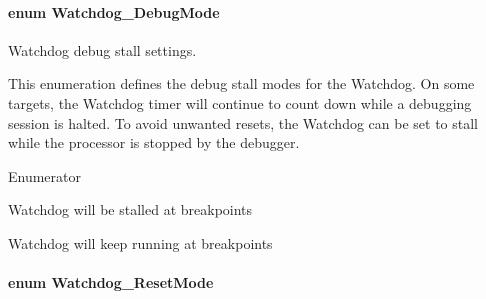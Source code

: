 \paragraph[{Watchdog\+\_\+\+Debug\+Mode}]{\setlength{\rightskip}{0pt plus 5cm}enum {\bf Watchdog\+\_\+\+Debug\+Mode}}\label{_watchdog_8h_ab1aa5862661c88a16b9d7bc12709d51e}


Watchdog debug stall settings. 

This enumeration defines the debug stall modes for the Watchdog. On some targets, the Watchdog timer will continue to count down while a debugging session is halted. To avoid unwanted resets, the Watchdog can be set to stall while the processor is stopped by the debugger. \begin{Desc}
\item[Enumerator]\par
\begin{description}
\item[{\em 
Watchdog\+\_\+\+D\+E\+B\+U\+G\+\_\+\+S\+T\+A\+L\+L\+\_\+\+O\+N\label{_watchdog_8h_ab1aa5862661c88a16b9d7bc12709d51ea787c87976091a6f294070dadd1747ed0}
}]Watchdog will be stalled at breakpoints \item[{\em 
Watchdog\+\_\+\+D\+E\+B\+U\+G\+\_\+\+S\+T\+A\+L\+L\+\_\+\+O\+F\+F\label{_watchdog_8h_ab1aa5862661c88a16b9d7bc12709d51ea745be9d89bc0c15eda5c4082020f8bb2}
}]Watchdog will keep running at breakpoints \end{description}
\end{Desc}
\paragraph[{Watchdog\+\_\+\+Reset\+Mode}]{\setlength{\rightskip}{0pt plus 5cm}enum {\bf Watchdog\+\_\+\+Reset\+Mode}}\label{_watchdog_8h_ada0db7216129d7dad494bb0cd0169f88}


